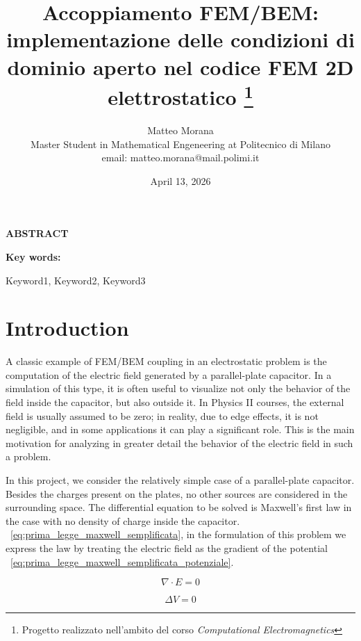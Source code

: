 \documentclass[11pt,onecolumn]{article}
\title{Accoppiamento FEM/BEM: implementazione delle condizioni di dominio aperto nel codice FEM 2D
elettrostatico \thanks{Progetto realizzato nell'ambito del corso \textit{Computational Electromagnetics}}}
\author{Matteo Morana \\
Master Student in Mathematical Engeneering at Politecnico di Milano \\ email: matteo.morana@mail.polimi.it}
\date{April 13, 2026}
\newenvironment{cwpabstract}
{%
  \begin{list}{}{%
    \setlength{\leftmargin}{0.32\textwidth} %
    \setlength{\rightmargin}{0pt}
    \setlength{\listparindent}{0pt}
    \setlength{\itemindent}{0pt}
    \setlength{\parsep}{0pt}
  }
  \item[]
  \noindent\textbf{ABSTRACT}\par
  \vspace{0.5em}
  \normalsize
}
{%
  \end{list}
}
\newenvironment{cwpkeywords}
{%
  \begin{list}{}{%
    \setlength{\leftmargin}{0.32\textwidth}
    \setlength{\rightmargin}{0pt}
  }
  \item[]\textbf{Key words: }
}
{%
  \end{list}
}
\begin{document}
\maketitle


\begin{cwpabstract}
\lipsum[2]
\end{cwpabstract}


\begin{cwpkeywords}
Keyword1, Keyword2, Keyword3 
\end{cwpkeywords}


\section{Introduction}
A classic example of FEM/BEM coupling in an electrostatic problem is the computation of the electric field generated by a parallel-plate capacitor. In a simulation of this type, it is often useful to visualize not only the behavior of the field inside the capacitor, but also outside it. In Physics II courses, the external field is usually assumed to be zero; in reality, due to edge effects, it is not negligible, and in some applications it can play a significant role. This is the main motivation for analyzing in greater detail the behavior of the electric field in such a problem.

In this project, we consider the relatively simple case of a parallel-plate capacitor. Besides the charges present on the plates, no other sources are considered in the surrounding space. The differential equation to be solved is Maxwell's first law in the case with no density of charge inside the capacitor. ~\eqref{eq:prima_legge_maxwell_semplificata}, in the formulation of this problem we express the law by treating the electric field as the gradient of the potential ~\eqref{eq:prima_legge_maxwell_semplificata_potenziale}.

\begin{equation}
	\nabla \cdot E = 0
\label{eq:prima_legge_maxwell_semplificata}
\end{equation}

\begin{equation}
	\Delta V = 0
\label{eq:prima_legge_maxwell_semplificata_potenziale}
\end{equation}
\end{document}
